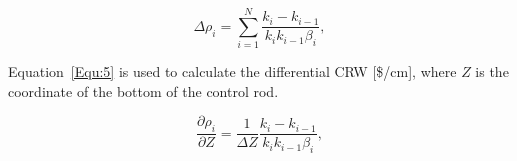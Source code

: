 \begin{equation}
\label{Equ:4}
{{\Delta}{\rho}_{i}}=\sum_{i=1}^{N}\dfrac{{k_{i}}-{k_{i-1}}}{{{k_{i}}{k_{i-1}}}{{\beta}_{i}}},
\end{equation}

Equation~\ref{Equ:5} is used to calculate the differential CRW [\$/cm], where 
$Z$ is the coordinate of the bottom of the control rod.

\begin{equation}
\label{Equ:5}
\dfrac{{\partial}{\rho}_{i}}{{\partial{Z}}}=\dfrac{1}{{\Delta}{Z}}\dfrac{{k_{i}}-{k_{i-1}}}{{{k_{i}}{k_{i-1}}}{{\beta}_{i}}},
\end{equation}


